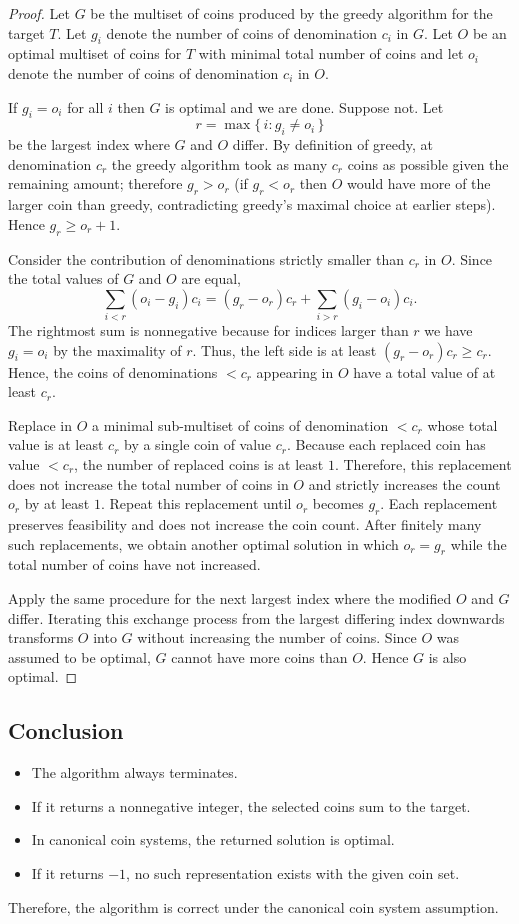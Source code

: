 \documentclass[12pt,a4paper]{report}
\begin{document}
\begin{proof}
Let $G$ be the multiset of coins produced by the greedy algorithm for the target $T$. Let $g_i$ denote the number of coins of denomination $c_i$ in $G$. Let $O$ be an optimal multiset of coins for $T$ with minimal total number of coins and let $o_i$ denote the number of coins of denomination $c_i$ in $O$.

If $g_i=o_i$ for all $i$ then $G$ is optimal and we are done. Suppose not. Let
\[
r=\max\{\,i: g_i\ne o_i\,\}
\]
be the largest index where $G$ and $O$ differ. By definition of greedy, at denomination $c_r$ the greedy algorithm took as many $c_r$ coins as possible given the remaining amount; therefore $g_r>o_r$ (if $g_r<o_r$ then $O$ would have more of the larger coin than greedy, contradicting greedy's maximal choice at earlier steps). Hence $g_r\ge o_r+1$.

Consider the contribution of denominations strictly smaller than $c_r$ in $O$. Since the total values of $G$ and $O$ are equal,
\[
\sum_{i<r} (o_i-g_i)c_i = (g_r-o_r)c_r + \sum_{i>r} (g_i-o_i)c_i.
\]
The rightmost sum is nonnegative because for indices larger than $r$ we have $g_i=o_i$ by the maximality of $r$. Thus, the left side is at least $(g_r-o_r)c_r\ge c_r$.
Hence, the coins of denominations $<c_r$ appearing in $O$ have a total value of at least $c_r$.

Replace in $O$ a minimal sub-multiset of coins of denomination $<c_r$ whose total value is at least $c_r$ by a single coin of value $c_r$. Because each replaced coin has value $<c_r$, the number of replaced coins is at least $1$. Therefore, this replacement does not increase the total number of coins in $O$ and strictly increases the count $o_r$ by at least $1$. Repeat this replacement until $o_r$ becomes $g_r$. Each replacement preserves feasibility and does not increase the coin count. After finitely many such replacements, we obtain another optimal solution in which $o_r=g_r$ while the total number of coins have not increased.

Apply the same procedure for the next largest index where the modified $O$ and $G$ differ. Iterating this exchange process from the largest differing index downwards transforms $O$ into $G$ without increasing the number of coins. Since $O$ was assumed to be optimal, $G$ cannot have more coins than $O$. Hence $G$ is also optimal.
\end{proof}

\subsection{Conclusion}
\begin{itemize}
    \item The algorithm always terminates.
    \item If it returns a nonnegative integer, the selected coins sum to the target.
    \item In canonical coin systems, the returned solution is optimal.
    \item If it returns $-1$, no such representation exists with the given coin set.
\end{itemize}
Therefore, the algorithm is correct under the canonical coin system assumption.
\end{document}
